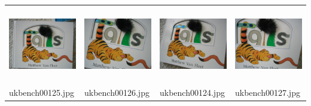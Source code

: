 \begin{tabular}{p{1.3in} p{1.3in} p{1.3in} p{1.3in} }
\includegraphics[keepaspectratio=false, height=1.3in, width=1.3in]{../datasets/ukbench-test/ukbench00125.jpg} & \includegraphics[keepaspectratio=false, height=1.3in, width=1.3in]{../datasets/ukbench-training/ukbench00126.jpg} & \includegraphics[keepaspectratio=false, height=1.3in, width=1.3in]{../datasets/ukbench-training/ukbench00124.jpg} & \includegraphics[keepaspectratio=false, height=1.3in, width=1.3in]{../datasets/ukbench-training/ukbench00127.jpg}\\
ukbench00125.jpg & ukbench00126.jpg & ukbench00124.jpg & ukbench00127.jpg\\
\end{tabular}


